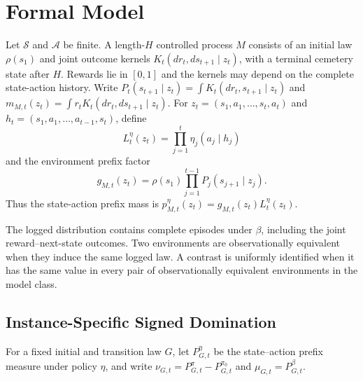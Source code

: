 \section{Formal Model}

Let $\mathcal S$ and $\mathcal A$ be finite. A length-$H$ controlled process $M$ consists of an initial law $\rho(s_1)$ and joint outcome kernels
$K_t(dr_t,ds_{t+1}\mid z_t)$, with a terminal cemetery state after $H$. Rewards lie in $[0,1]$ and the kernels may depend on the complete state-action history. Write
$P_t(s_{t+1}\mid z_t)=\int K_t(dr_t,s_{t+1}\mid z_t)$ and
$m_{M,t}(z_t)=\int r_t K_t(dr_t,ds_{t+1}\mid z_t)$.
For
$z_t=(s_1,a_1,\ldots,s_t,a_t)$ and
$h_t=(s_1,a_1,\ldots,a_{t-1},s_t)$, define
\[
L_t^\eta(z_t)=\prod_{j=1}^t\eta_j(a_j\mid h_j)
\]
and the environment prefix factor
\[
g_{M,t}(z_t)=\rho(s_1)\prod_{j=1}^{t-1}P_j(s_{j+1}\mid z_j).
\]
Thus the state-action prefix mass is
$p_{M,t}^\eta(z_t)=g_{M,t}(z_t)L_t^\eta(z_t)$.

The logged distribution contains complete episodes under $\beta$, including the joint reward--next-state outcomes. Two environments are observationally equivalent when they induce the same logged law. A contrast is uniformly identified when it has the same value in every pair of observationally equivalent environments in the model class.

\subsection{Instance-Specific Signed Domination}
For a fixed initial and transition law $G$, let $P_{G,t}^\eta$ be the state--action prefix measure under policy $\eta$, and write
$\nu_{G,t}=P_{G,t}^\pi-P_{G,t}^{\pi_0}$ and
$\mu_{G,t}=P_{G,t}^\beta$.

